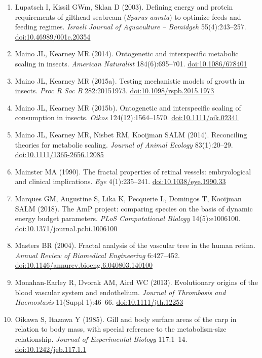 \begin{small}
\begin{enumerate}[label={},leftmargin=1.2em,itemindent=-1.2em,itemsep=0.15em]
\item Lupatsch I, Kissil GWm, Sklan D (2003). Defining energy and protein requirements of gilthead seabream (\emph{Sparus aurata}) to optimize feeds and feeding regimes. \emph{Israeli Journal of Aquaculture – Bamidgeh} 55(4):243–257. \href{https://doi.org/10.46989/001c.20354}{doi:10.46989/001c.20354}
\item Maino JL, Kearney MR (2014). Ontogenetic and interspecific metabolic scaling in insects. \emph{American Naturalist} 184(6):695–701. \href{https://doi.org/10.1086/678401}{doi:10.1086/678401}
\item Maino JL, Kearney MR (2015a). Testing mechanistic models of growth in insects. \emph{Proc R Soc B} 282:20151973. \href{https://doi.org/10.1098/rspb.2015.1973}{doi:10.1098/rspb.2015.1973}
\item Maino JL, Kearney MR (2015b). Ontogenetic and interspecific scaling of consumption in insects. \emph{Oikos} 124(12):1564–1570. \href{https://doi.org/10.1111/oik.02341}{doi:10.1111/oik.02341}
\item Maino JL, Kearney MR, Nisbet RM, Kooijman SALM (2014). Reconciling theories for metabolic scaling. \emph{Journal of Animal Ecology} 83(1):20–29. \href{https://doi.org/10.1111/1365-2656.12085}{doi:10.1111/1365-2656.12085}
\item Mainster MA (1990). The fractal properties of retinal vessels: embryological and clinical implications. \emph{Eye} 4(1):235–241. \href{https://doi.org/10.1038/eye.1990.33}{doi:10.1038/eye.1990.33}
\item Marques GM, Augustine S, Lika K, Pecquerie L, Domingos T, Kooijman SALM (2018). The AmP project: comparing species on the basis of dynamic energy budget parameters. \emph{PLoS Computational Biology} 14(5):e1006100. \href{https://doi.org/10.1371/journal.pcbi.1006100}{doi:10.1371/journal.pcbi.1006100}
\item Masters BR (2004). Fractal analysis of the vascular tree in the human retina. \emph{Annual Review of Biomedical Engineering} 6:427–452. \href{https://doi.org/10.1146/annurev.bioeng.6.040803.140100}{doi:10.1146/annurev.bioeng.6.040803.140100}
\item Monahan-Earley R, Dvorak AM, Aird WC (2013). Evolutionary origins of the blood vascular system and endothelium. \emph{Journal of Thrombosis and Haemostasis} 11(Suppl 1):46–66. \href{https://doi.org/10.1111/jth.12253}{doi:10.1111/jth.12253}
\item Oikawa S, Itazawa Y (1985). Gill and body surface areas of the carp in relation to body mass, with special reference to the metabolism-size relationship. \emph{Journal of Experimental Biology} 117:1–14. \href{https://doi.org/10.1242/jeb.117.1.1}{doi:10.1242/jeb.117.1.1}

\end{enumerate}
\end{small}

